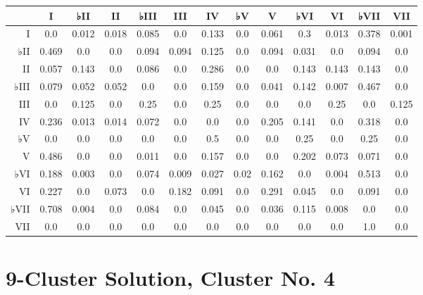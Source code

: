 \begin{table}[htbp]
\begin{minipage}{\linewidth}
\setlength{\tymax}{0.5\linewidth}
\centering
\small
\begin{tabulary}{\textwidth}{@{}RCCCCCCCCCCCC@{}} \toprule
&I&♭II&II&♭III&III&IV&♭V&V&♭VI&VI&♭VII&VII\\
\midrule
I&0.0&0.012&0.018&0.085&0.0&0.133&0.0&0.061&0.3&0.013&0.378&0.001\\
♭II&0.469&0.0&0.0&0.094&0.094&0.125&0.0&0.094&0.031&0.0&0.094&0.0\\
II&0.057&0.143&0.0&0.086&0.0&0.286&0.0&0.0&0.143&0.143&0.143&0.0\\
♭III&0.079&0.052&0.052&0.0&0.0&0.159&0.0&0.041&0.142&0.007&0.467&0.0\\
III&0.0&0.125&0.0&0.25&0.0&0.25&0.0&0.0&0.0&0.25&0.0&0.125\\
IV&0.236&0.013&0.014&0.072&0.0&0.0&0.0&0.205&0.141&0.0&0.318&0.0\\
♭V&0.0&0.0&0.0&0.0&0.0&0.5&0.0&0.0&0.25&0.0&0.25&0.0\\
V&0.486&0.0&0.0&0.011&0.0&0.157&0.0&0.0&0.202&0.073&0.071&0.0\\
♭VI&0.188&0.003&0.0&0.074&0.009&0.027&0.02&0.162&0.0&0.004&0.513&0.0\\
VI&0.227&0.0&0.073&0.0&0.182&0.091&0.0&0.291&0.045&0.0&0.091&0.0\\
♭VII&0.708&0.004&0.0&0.084&0.0&0.045&0.0&0.036&0.115&0.008&0.0&0.0\\
VII&0.0&0.0&0.0&0.0&0.0&0.0&0.0&0.0&0.0&0.0&1.0&0.0\\

\bottomrule

\end{tabulary}
\end{minipage}
\end{table}

\section{9-Cluster Solution, Cluster No. 4}
\label{9-clustersolutionclusterno.4}

